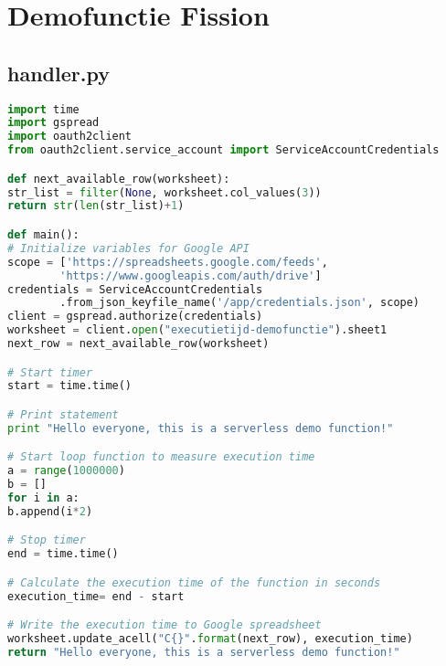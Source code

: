 \newpage
\section{Demofunctie Fission}
\subsection{handler.py}
\label{sec:demofunctie-fission}
\begin{lstlisting}[language=python]
import time
import gspread
import oauth2client
from oauth2client.service_account import ServiceAccountCredentials

def next_available_row(worksheet):
str_list = filter(None, worksheet.col_values(3))
return str(len(str_list)+1)

def main():   
# Initialize variables for Google API
scope = ['https://spreadsheets.google.com/feeds',
        'https://www.googleapis.com/auth/drive']
credentials = ServiceAccountCredentials
        .from_json_keyfile_name('/app/credentials.json', scope)
client = gspread.authorize(credentials)
worksheet = client.open("executietijd-demofunctie").sheet1
next_row = next_available_row(worksheet)

# Start timer 
start = time.time()

# Print statement
print "Hello everyone, this is a serverless demo function!"

# Start loop function to measure execution time
a = range(1000000)
b = []
for i in a:
b.append(i*2)

# Stop timer
end = time.time()

# Calculate the execution time of the function in seconds
execution_time= end - start

# Write the execution time to Google spreadsheet
worksheet.update_acell("C{}".format(next_row), execution_time)
return "Hello everyone, this is a serverless demo function!"


\end{lstlisting}